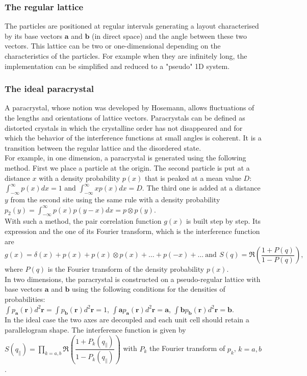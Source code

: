 \subsubsection{The regular  lattice}
The particles are positioned at regular intervals generating a layout characterised by its base vectors $\mathbf{a}$ and $\mathbf{b}$ (in direct space) and the angle between these two vectors.
This lattice can be two or one-dimensional depending on the characteristics of the particles. For example when they are infinitely long, the implementation can be simplified and reduced to a "pseudo" 1D system.

\subsubsection{The ideal paracrystal} 
A paracrystal, whose notion  was developed by Hosemann\cite{Hos51}, allows fluctuations of the lengths and orientations of lattice vectors. Paracrystals can be defined as distorted crystals in which the crystalline order has not disappeared and for which the behavior of the interference functions  at small angles is coherent.
It is a transition between the regular lattice and the disordered state.\\


For example, in one dimension, a paracrystal is generated using the following method. First we place a particle at the origin. The second particle is put at a distance $x$ with a density probability $p(x)$ that is peaked at a mean value $D$: $\int_{-\infty} ^{\infty}p(x)dx=1$ and $\int_{-\infty}^{\infty}xp(x)dx=D$. The third one is added at a distance $y$ from the second site using the same rule with a density probability $p_2(y)= \int_{-\infty}^{\infty}p(x)p(y-x)dx=p\otimes p(y)$.\\ With such a method, the pair correlation function $g(x)$ is built step by step. Its expression and the one of its Fourier transform, which is the interference function are 
\begin{equation*}
g(x)=\delta(x)+ p(x)+ p(x)\otimes p(x)+\ldots + p(-x)+\ldots \: \mathrm{and}\:\, S(q)=\Re\left(\dfrac{1+P(q)}{1-P(q)}\right),
\end{equation*}
 where $P(q)$ is the Fourier transform of the density probability $p(x)$.\\


In two dimensions, the paracrystal is constructed on a pseudo-regular lattice with base vectors $\mathbf{a}$ and $\mathbf{b}$ using the following conditions for the densities of probabilities:\\ $\int p_{\mathbf{a}}(\mathbf{r})d^2\mathbf{r}=\int p_{\mathbf{b}}(\mathbf{r})d^2\mathbf{r}=1$, $\int \mathbf{a} p_{\mathbf{a}}(\mathbf{r})d^2\mathbf{r}=\mathbf{a}$, $\int \mathbf{b} p_{\mathbf{b}}(\mathbf{r})d^2\mathbf{r}=\mathbf{b}$.\\
In the ideal case the two axes are decoupled and each unit cell should retain a parallelogram shape. The interference function is given by $S(q_{\parallel})=\prod_{k=a,b}\Re\left(\dfrac{1+P_k(q_{\parallel})}{1-P_k(q_{\parallel})} \right)$ with $P_k$ the Fourier transform of $p_k$, $k=a, b$.

